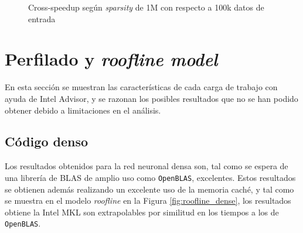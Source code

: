 \begin{figure}[htpb]
    \centering
    \caption{Cross-speedup según \textit{sparsity} de 1M con respecto a 100k datos de entrada}
    \label{fig:cross_speedup_1M_100k}
\end{figure}

\section{Perfilado y \textit{roofline model}}
\label{sec:perfilado_roofline}
En esta sección se muestran las características de cada carga de trabajo con ayuda de Intel Advisor, y se razonan los posibles resultados que no se han podido obtener debido a limitaciones en el análisis.

\subsection{Código denso}
Los resultados obtenidos para la red neuronal densa son, tal como se espera de una librería de BLAS de amplio uso como \texttt{OpenBLAS}, excelentes. Estos resultados se obtienen además realizando un excelente uso de la memoria caché, y tal como se muestra en el modelo \textit{roofline} en la Figura \ref{fig:roofline_dense}, los resultados obtiene la Intel MKL son extrapolables por similitud en los tiempos a los de \texttt{OpenBLAS}.

